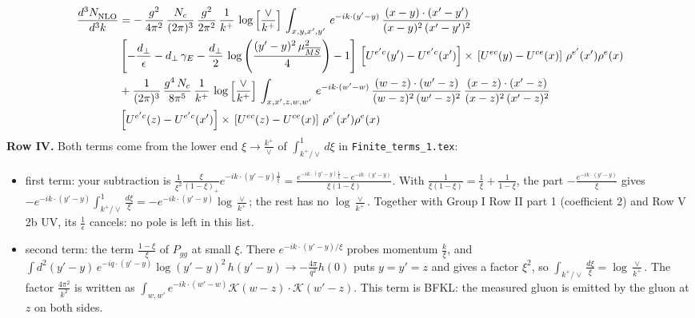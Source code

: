 \documentclass[9pt]{article}
\newcommand{\new}[1]{{\color{blue}#1}}
\numberwithin{equation}{section}
\begin{document}
{\color{blue}
\begin{align}
\frac{d^{3}N_{\rm NLO}^{\rm}}{d^{3}k}  & = -\,\frac{g^{2}}{4\pi^{2}}\, \frac{N_{c}}{(2\pi)^{3}}\,\frac{g^{2}}{2\pi^{2}}\, \frac{1}{k^{+}}\,\log{\left[\frac{\vee}{k^{+}}\right]}\,\int_{x,y,x',y'}\,e^{-ik\cdot (y'-y)}\,\frac{(x-y)\cdot (x'-y')}{(x-y)^{2}\,(x'-y')^{2}}\notag \\
& \left[-\frac{d_{\perp}}{\epsilon}-d_{\perp}\,\gamma_{E}-\frac{d_{\perp}}{2}\,\log{\left(\frac{(y'-y)^{2}\,\mu^{2}_{\overline{MS}}}{4}\right)}-1\right]\,\left[U^{e'c}(y') - U^{e'c}(x')\right] \times\, \left[U^{ec}(y) - U^{ce}(x)\right]\, \rho^{e'}(x') \rho^{e}(x)\notag \\
& +\frac{1}{(2\pi)^{3}}\,\frac{g^{4}\,N_{c}}{8\pi^{5}}\,\frac{1}{k^{+}}\,\log{\left[\frac{\vee}{k^{+}}\right]}\,\int_{x,x',z,w,w'}\,e^{-ik\cdot (w'-w)}\,\frac{(w-z)\cdot(w'-z)}{(w-z)^{2}\,(w'-z)^{2}}\,\frac{(x-z)\cdot(x'-z)}{(x-z)^{2}\,(x'-z)^{2}}\notag \\
& \left[U^{e'c}(z) - U^{e'c}(x')\right] \times\, \left[U^{ec}(z) - U^{ce}(x)\right]\, \rho^{e'}(x') \rho^{e}(x)
\end{align}}
\new{\textbf{Row IV.} Both terms come from the lower end $\xi\to\frac{k^+}{\vee}$ of $\int_{k^+/\vee}^1d\xi$ in \texttt{Finite\_terms\_1.tex}:}
\begin{itemize}
\item \new{first term: your subtraction is $\frac{1}{\xi^2}\frac{\xi}{(1-\xi)_+}e^{-ik\cdot(y'-y)\frac1\xi}=\frac{e^{-ik\cdot(y'-y)\frac1\xi}-e^{-ik\cdot(y'-y)}}{\xi(1-\xi)}$. With $\frac{1}{\xi(1-\xi)}=\frac1\xi+\frac{1}{1-\xi}$, the part $-\frac{e^{-ik\cdot(y'-y)}}{\xi}$ gives $-e^{-ik\cdot(y'-y)}\int_{k^+/\vee}^1\frac{d\xi}{\xi}=-e^{-ik\cdot(y'-y)}\log\frac{\vee}{k^+}$; the rest has no $\log\frac{\vee}{k^+}$. Together with Group I Row II part 1 (coefficient 2) and Row V 2b UV, its $\frac1\epsilon$ cancels: no pole is left in this list.}
\item \new{second term: the term $\frac{1-\xi}{\xi}$ of $P_{gg}$ at small $\xi$. There $e^{-ik\cdot(y'-y)/\xi}$ probes momentum $\frac{k}{\xi}$, and $\int d^2(y'-y)\,e^{-iq\cdot(y'-y)}\log(y'-y)^2\,h(y'-y)\to-\frac{4\pi}{q^2}h(0)$ puts $y=y'=z$ and gives a factor $\xi^2$, so $\int_{k^+/\vee}\frac{d\xi}{\xi}=\log\frac{\vee}{k^+}$. The factor $\frac{4\pi^2}{k^2}$ is written as $\int_{w,w'}e^{-ik\cdot(w'-w)}\mathcal K(w-z)\cdot\mathcal K(w'-z)$. This term is BFKL: the measured gluon is emitted by the gluon at $z$ on both sides.}
\end{itemize}
\end{document}
